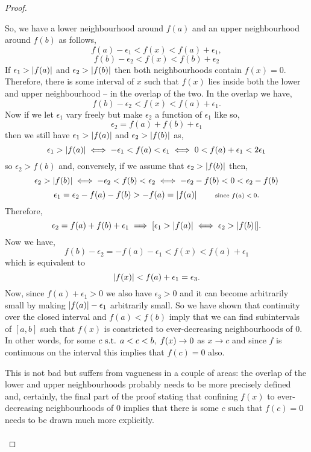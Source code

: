 \documentclass[MathsNotesBase.tex]{subfiles}
\begin{document}
{\begin{proof}
\begin{displayquote}
				So, we have a lower neighbourhood around $f(a)$ and an upper neighbourhood around $f(b)$ as follows,
				\[ f(a) - \epsilon_1 < f(x) < f(a) + \epsilon_1, \]
				\[ f(b) - \epsilon_2 < f(x) < f(b) + \epsilon_2 \]
				If ${ \epsilon_1 > \left\lvert f(a)\right\rvert }$ and ${ \epsilon_2 > \left\lvert f(b)\right\rvert }$ then both neighbourhoods contain ${ f(x) = 0 }$. Therefore, there is some interval of $x$ such that ${ f(x) }$ lies inside both the lower and upper neighbourhood -- in the overlap of the two. In the overlap we have,
				\[ f(b) - \epsilon_2 < f(x) < f(a) + \epsilon_1. \]
				Now if we let $\epsilon_1$ vary freely but make $\epsilon_2$ a function of $\epsilon_1$ like so,
				\[ \epsilon_2 = f(a) + f(b) + \epsilon_1 \]
				then we still have ${ \epsilon_1 > \left\lvert f(a)\right\rvert }$ and ${ \epsilon_2 > \left\lvert f(b)\right\rvert }$ as,
				\[ \epsilon_1 > \left\lvert f(a)\right\rvert \iff -\epsilon_1 < f(a) < \epsilon_1 \iff 0 < f(a) + \epsilon_1 < 2\epsilon_1 \]
				so ${ \epsilon_2 > f(b) }$ and, conversely, if we assume that ${ \epsilon_2 > \left\lvert f(b)\right\rvert }$ then,
				\[ \epsilon_2 > \left\lvert f(b)\right\rvert \iff -\epsilon_2 < f(b) < \epsilon_2 \iff -\epsilon_2 - f(b) < 0 < \epsilon_2 - f(b) \]
				\[ \epsilon_1 = \epsilon_2 - f(a) - f(b) > -f(a) = \left\lvert f(a)\right\rvert \hspace{20pt}\text{\scriptsize{since ${ f(a) < 0 }$}}. \]
				Therefore,
				\[ \epsilon_2 = f(a) + f(b) + \epsilon_1 \implies [ \epsilon_1 > \left\lvert f(a)\right\rvert \iff \epsilon_2 > \left\lvert f(b)\right\rvert ]. \]
				Now we have,
				\[ f(b) - \epsilon_2 = -f(a) - \epsilon_1 < f(x) < f(a) + \epsilon_1 \]
				which is equivalent to
				\[ \left\lvert f(x)\right\rvert < f(a) + \epsilon_1 = \epsilon_3. \]
				Now, since ${ f(a) + \epsilon_1 > 0 }$ we also have ${ \epsilon_3 > 0 }$ and it can become arbitrarily small by making ${ \left\lvert f(a)\right\rvert - \epsilon_1 }$ arbitrarily small. So we have shown that continuity over the closed interval and ${ f(a) < f(b) }$ imply that we can find subintervals of ${ [a,b] }$ such that ${ f(x) }$ is constricted to ever-decreasing neighbourhoods of 0. In other words, for some ${c \text{ s.t. } a < c < b, \; f(x) \to 0 }$ as  ${ x \to c }$ and since $f$ is continuous on the interval this implies that ${ f(c) = 0 }$ also. 
			\end{displayquote}
			This is not bad but suffers from vagueness in a couple of areas: the overlap of the lower and upper neighbourhoods probably needs to be more precisely defined and, certainly, the final part of the proof stating that confining $f(x)$ to ever-decreasing neighbourhoods of 0 implies that there is some $c$ such that ${ f(c) = 0 }$ needs to be drawn much more explicitly.\\\\

\end{proof}}
\end{document}
